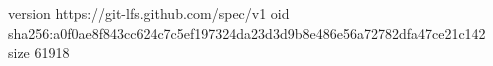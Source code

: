 version https://git-lfs.github.com/spec/v1
oid sha256:a0f0ae8f843cc624c7c5ef197324da23d3d9b8e486e56a72782dfa47ce21c142
size 61918
